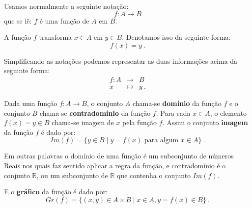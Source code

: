 \newpage

Usamos normalmente a seguinte notação:
\[f: A \rightarrow B\]
que se lê: $f$ é uma função de $A$ em $B$.

A função $f$ transforma $x \in A$ em $y \in B$. Denotamos isso da seguinte forma:
\[f(x) = y \ .\]

Simplificando as notações podemos representar as duas informações acima da seguinte forma:
\begin{eqnarray*}
 f: A & \rightarrow & B \\
 x & \mapsto & y \ .
\end{eqnarray*}

Dada uma função $f: A \rightarrow B$, o conjunto $A$ chama-se \textbf{domínio} da função $f$ e o conjunto $B$ chama-se \textbf{contradomínio} da função $f$.  Para cada $x \in A$, o elemento $f(x)= y \in B$ chama-se imagem de $x$ pela função $f$. Assim o conjunto \textbf{imagem} da função $f$ é dado por:
\[Im(f)= \{ y \in B \mid y = f(x) \text{ para algum } x \in A\} \ .\]

Em outras palavras o domínio de uma função é um subconjunto de números Reais nos quais faz sentido aplicar a regra da função, e contradomínio é o conjunto $\mathbb{R}$, ou um subconjunto de $\mathbb{R}$ que contenha o conjunto $Im(f)$.

E o \textbf{gráfico} da função é dado por:
\[Gr(f) = \{ (x, y) \in A \times B \mid x \in A, y = f(x) \in B\} \ .\]

